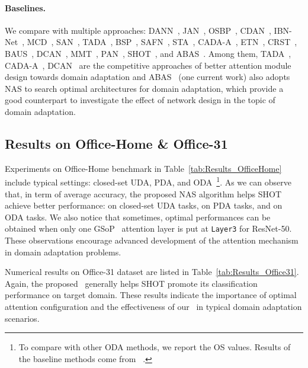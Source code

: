 \documentclass[10pt,twocolumn,letterpaper]{article}
\begin{document}
\paragraph{Baselines.}
We compare with multiple  approaches: DANN~\cite{ganin2015DANN}, JAN~\cite{long2017JAN}, OSBP~\cite{saito2018OSBP}, CDAN~\cite{long2018CDAN}, IBN-Net~\cite{pan2018IBNNet}, MCD~\cite{saito2018MCD}, SAN~\cite{cao2018SAN}, TADA~\cite{wang2019TADA}, BSP~\cite{chen2019BSP}, SAFN~\cite{xu2019SAFN}, STA~\cite{liu2019STA}, CADA-A~\cite{kurmi2019CADA}, ETN~\cite{cao2019ETN}, CRST~\cite{zou2019CRST}, BAUS~\cite{liang2020BA3US}, DCAN~\cite{li2020DCAN}, MMT~\cite{ge2020MMT}, PAN~\cite{wang2020PAN}, SHOT~\cite{liang2020shot}, and ABAS~\cite{robbiano2021adversarial}. Among them, TADA~\cite{wang2019TADA}, CADA-A~\cite{kurmi2019CADA}, DCAN~\cite{li2020DCAN} are the competitive approaches of better attention module design towards domain adaptation and ABAS~\cite{robbiano2021adversarial} (one current work) also adopts NAS to search optimal architectures for domain adaptation, which provide a good counterpart to investigate the effect of network design in the topic of domain adaptation.

\subsection{Results on Office-Home \& Office-31}
Experiments on Office-Home benchmark in Table~\ref{tab:Results_OfficeHome} include  typical settings: closed-set UDA, PDA, and ODA~\footnote{To compare with other ODA methods, we report the OS values. Results of the baseline methods come from ~\cite{liang2020shot}.}.
As we can observe that, in term of average accuracy, the proposed NAS algorithm helps SHOT achieve better performance:  on closed-set UDA tasks,  on PDA tasks, and  on ODA tasks. We also notice that sometimes, optimal performances can be obtained when only one GSoP~\cite{gao2019GSoP} attention layer is put at \texttt{Layer3} for ResNet-50. These observations encourage advanced development of the attention mechanism in domain adaptation problems.






Numerical results on Office-31 dataset are listed in Table~\ref{tab:Results_Office31}.
Again, the proposed \iMethod\, generally helps SHOT promote its classification performance on target domain. These results indicate the importance of optimal attention configuration and the effectiveness of our \iMethod\, in typical domain adaptation scenarios.
\end{document}
